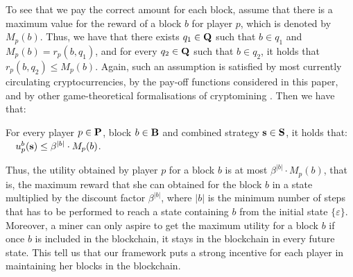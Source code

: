 To see that we pay the correct amount for each block, assume that there is a maximum value for the reward of a block $b$ for player $p$, which is denoted by $M_p(b)$. Thus, we have that there exists $q_1 \in \mathbf{Q}$ such that $b \in q_1$ and $M_p(b) = r_p(b,q_1)$, and for every $q_2 \in \mathbf{Q}$ such that $b \in q_2$, it holds that $r_p(b,q_2) \leq M_p(b)$. Again, such an assumption is satisfied by most currently circulating cryptocurrencies, by the pay-off functions considered in this paper, and by other game-theoretical formalisations of cryptomining \cite{mininggames:2016,koutsoupias2018blockchain}. Then we have that:
\begin{myprop}\label{prop-ub-block}
For every player $p \in \mathbf{P}$, block $b \in \mathbf{B}$ and combined strategy $\mathbf{s} \in \mathbf{S}$, it holds that: \ \ $u^b_p(\mathbf{s})  \leq   \beta^{|b|} \cdot M_p(b)$.
\end{myprop}
Thus, the utility obtained by player $p$ for a block $b$ is at most $\beta^{|b|} \cdot M_p(b)$, that is, the maximum reward that she can obtained for the block $b$ in a state multiplied by the discount factor $\beta^{|b|}$, where $|b|$ is the minimum number of steps that has to be performed to reach a state containing $b$ from the initial state $\{\varepsilon\}$. 
Moreover, a miner can only aspire to get the maximum utility for a block $b$ if once $b$ is included in the blockchain, it stays in the blockchain in every future state. This tell us that our framework puts a strong incentive for each player in maintaining her blocks in the blockchain.


